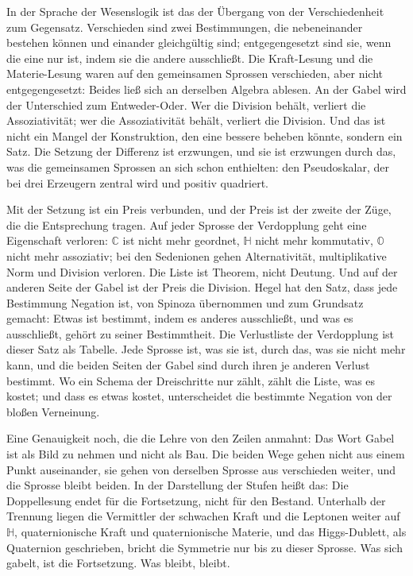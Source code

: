\documentclass[11pt,a4paper]{article}
\newcommand{\Randlesart}{\marginpar{\raggedright\footnotesize\textcolor{lesart}{$\bigcirc$\,Lesart}}}
\newcommand{\C}{\mathbb C}
\newcommand{\HH}{\mathbb H}
\newcommand{\Oc}{\mathbb O}
\begin{document}
\Randlesart In der Sprache der Wesenslogik ist das der Übergang von der Verschiedenheit zum Gegensatz. Verschieden sind zwei Bestimmungen, die nebeneinander bestehen können und einander gleichgültig sind; entgegengesetzt sind sie, wenn die eine nur ist, indem sie die andere ausschließt. Die Kraft-Lesung und die Materie-Lesung waren auf den gemeinsamen Sprossen verschieden, aber nicht entgegengesetzt: Beides ließ sich an derselben Algebra ablesen. An der Gabel wird der Unterschied zum Entweder-Oder. Wer die Division behält, verliert die Assoziativität; wer die Assoziativität behält, verliert die Division. Und das ist nicht ein Mangel der Konstruktion, den eine bessere beheben könnte, sondern ein Satz. Die Setzung der Differenz ist erzwungen, und sie ist erzwungen durch das, was die gemeinsamen Sprossen an sich schon enthielten: den Pseudoskalar, der bei drei Erzeugern zentral wird und positiv quadriert.

Mit der Setzung ist ein Preis verbunden, und der Preis ist der zweite der Züge, die die Entsprechung tragen. Auf jeder Sprosse der Verdopplung geht eine Eigenschaft verloren: $\C$ ist nicht mehr geordnet, $\HH$ nicht mehr kommutativ, $\Oc$ nicht mehr assoziativ; bei den Sedenionen gehen Alternativität, multiplikative Norm und Division verloren. Die Liste ist Theorem, nicht Deutung. Und auf der anderen Seite der Gabel ist der Preis die Division. Hegel hat den Satz, dass jede Bestimmung Negation ist, von Spinoza übernommen und zum Grundsatz gemacht: Etwas ist bestimmt, indem es anderes ausschließt, und was es ausschließt, gehört zu seiner Bestimmtheit. Die Verlustliste der Verdopplung ist dieser Satz als Tabelle. Jede Sprosse ist, was sie ist, durch das, was sie nicht mehr kann, und die beiden Seiten der Gabel sind durch ihren je anderen Verlust bestimmt. Wo ein Schema der Dreischritte nur zählt, zählt die Liste, was es kostet; und dass es etwas kostet, unterscheidet die bestimmte Negation von der bloßen Verneinung.

Eine Genauigkeit noch, die die Lehre von den Zeilen anmahnt: Das Wort Gabel ist als Bild zu nehmen und nicht als Bau. Die beiden Wege gehen nicht aus einem Punkt auseinander, sie gehen von derselben Sprosse aus verschieden weiter, und die Sprosse bleibt beiden. In der Darstellung der Stufen heißt das: Die Doppellesung endet für die Fortsetzung, nicht für den Bestand. Unterhalb der Trennung liegen die Vermittler der schwachen Kraft und die Leptonen weiter auf $\HH$, quaternionische Kraft und quaternionische Materie, und das Higgs-Dublett, als Quaternion geschrieben, bricht die Symmetrie nur bis zu dieser Sprosse. Was sich gabelt, ist die Fortsetzung. Was bleibt, bleibt.
\end{document}
